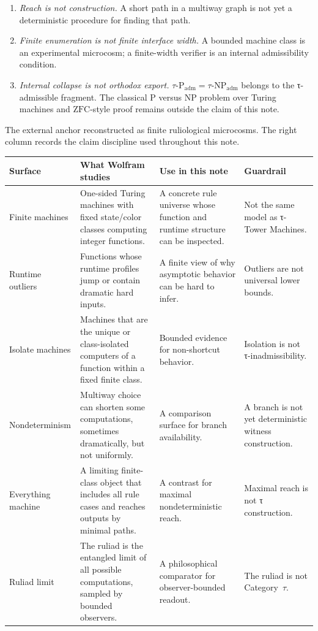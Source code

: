 \documentclass{pantarhei-researchnote}
\newcommand{\Padm}{\ensuremath{\tau\text{-}\mathrm{P}_{\mathrm{adm}}}}
\newcommand{\NPadm}{\ensuremath{\tau\text{-}\mathrm{NP}_{\mathrm{adm}}}}
\newcommand{\ZFC}{\ensuremath{\mathrm{ZFC}}}
\newcommand{\ClassP}{\ensuremath{\mathrm{P}}}
\newcommand{\ClassNP}{\ensuremath{\mathrm{NP}}}
\newcommand{\CategoryTau}{Category~\(\tau\)}
\begin{document}
\begin{enumerate}[leftmargin=1.2em,itemsep=1pt,topsep=2pt]
\item \emph{Reach is not construction.} A short path in a multiway graph
is not yet a deterministic procedure for finding that path.
\item \emph{Finite enumeration is not finite interface width.} A bounded
machine class is an experimental microcosm; a finite-width verifier is an
internal admissibility condition.
\item \emph{Internal collapse is not orthodox export.}
\(\Padm=\NPadm\) belongs to the τ-admissible fragment. The classical
\(\ClassP\) versus \(\ClassNP\) problem over Turing machines and
\ZFC-style proof remains outside the claim of this note.
\end{enumerate}

\begin{widetable}[t]
\caption{The external anchor reconstructed as finite ruliological
microcosms. The right column records the claim discipline used throughout
this note.}
\label{tab:wolfram-microcosms}
\prtablefont
\begin{tabularx}{\textwidth}{p{}Y Y Y}
\toprule
\textbf{Surface} & \textbf{What Wolfram studies} & \textbf{Use in this note} & \textbf{Guardrail} \\
\midrule
Finite machines & One-sided Turing machines with fixed state/color
classes computing integer functions. & A concrete rule universe whose
function and runtime structure can be inspected. & Not the same model as
τ-Tower Machines. \\
Runtime outliers & Functions whose runtime profiles jump or contain
dramatic hard inputs. & A finite view of why asymptotic behavior can be
hard to infer. & Outliers are not universal lower bounds. \\
Isolate machines & Machines that are the unique or class-isolated
computers of a function within a fixed finite class. & Bounded evidence
for non-shortcut behavior. & Isolation is not τ-inadmissibility. \\
Nondeterminism & Multiway choice can shorten some computations, sometimes
dramatically, but not uniformly. & A comparison surface for branch
availability. & A branch is not yet deterministic witness construction. \\
Everything machine & A limiting finite-class object that includes all
rule cases and reaches outputs by minimal paths. & A contrast for maximal
nondeterministic reach. & Maximal reach is not τ construction. \\
Ruliad limit & The ruliad is the entangled limit of all possible
computations, sampled by bounded observers. & A philosophical comparator
for observer-bounded readout. & The ruliad is not \CategoryTau. \\
\bottomrule
\end{tabularx}
\end{widetable}
\end{document}
